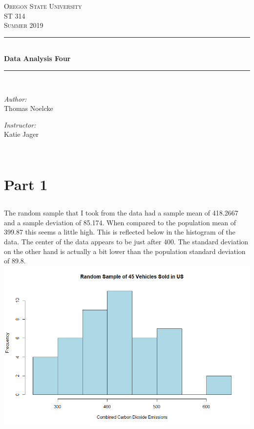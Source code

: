 \documentclass[letterpaper, onecolumn,10pt]{IEEEtran}
\begin{document}
    \begin{titlepage}
    \newcommand{\HRule}{\rule{\linewidth}{0.5mm}}
    \center
    \textsc{\Large Oregon State University}\\[1.5cm]
    \textsc{\Large ST 314}\\[0.5cm]
    \textsc{\Large Summer 2019}\\[0.5cm]
    \HRule \\[0.4cm]
    { \huge \bfseries Data Analysis Four}\\[0.4cm] %
    \HRule \\[1.5cm]
    \begin{minipage}{0.4\textwidth}
        \begin{flushleft} \large
        \emph{Author:}\\
        Thomas Noelcke
        \end{flushleft}
    \end{minipage}
    \begin{minipage}{0.4\textwidth}
        \begin{flushright} \large
        \emph{Instructor:} \\
        Katie Jager\\
        \end{flushright}
    \end{minipage}\\[2cm]
		\end{titlepage}
        
        \section{Part 1}
            \subsection{}
            The random sample that I took from the data had a sample mean of 418.2667 and a sample deviation of 85.174. When compared to the population mean of 399.87 this seems a little high. This is reflected below in the histogram of the data. The center of the data appears to be just after 400. The standard deviation on the other hand is actually a bit lower than the population standard deviation of 89.8.\\
            
            \includegraphics[width=\textwidth]{week4/Images/Rplot.png}
            
\end{document}
